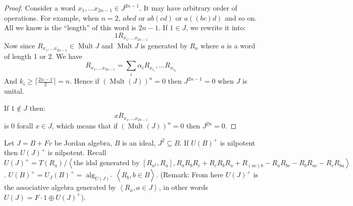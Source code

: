 \documentclass{article}
\def\<{\mathop{\langle}}
\def\>{\mathop{\rangle}}
\begin{document}
\begin{proof}
Consider a word $ x_1, \ldots x_{2n-1} \in J^{2n-1} $. It may have arbitrary order of operations. For example, when $ n=2 $, $ abcd $ or $ ab(cd) $ or $ a((bc)d) $ and so on. All we know is the ``length'' of this word is $ 2n-1 $. If $ 1 \in J $, we rewrite it into:
\[
1 R_{x_1, \ldots x_{2n-1}}
\]      
Now since $R_{x_1, \ldots x_{2n-1}} \in \operatorname{Mult}J  $ and $  \operatorname{Mult}J  $ is generated by $ R_a $ where $ a $ is a word of length 1 or 2. We have 
\[
R_{x_1, \ldots x_{2n-1}}=\sum_i \alpha_i R_{x_{i_1}}, \ldots R_{x_{i_{k_i}}}
\]    
And $ k_i \ge \lceil\frac{2n-1}{2}\rceil=n $. Hence if $ (\operatorname{Mult}(J))^{n}=0 $ then $ J^{2n-1}=0 $ when $ J $ is unital. 

If $ 1 \notin J $ then:
\[
xR_{x_1, \ldots x_{2n-1}}
\] 
is 0 forall $ x \in J $, which means that if $ (\operatorname{Mult}(J))^{n}=0 $ then $ J^{2n}=0 $. 
\end{proof}

\begin{lemma} 
Let $ J =B+Fv$ be Jordan algebra, $ B $ is an ideal, $ J^2 \subseteq B $. If $ U(B)^+ $ is nilpotent then $ U(J)^+ $ is nilpotent. Recall $ U(J)^+=T(R_a)/ \<\text{the idal generated by }[R_{a^2}, R_a], R_a R_b R_c +R_c R_b R_a +R_{(ac)b}-R_aR_{bc}-R_bR_{ac}-R_cR_{ba} \> $. $ U(B)^+=U_J(B)^+=\operatorname{alg}_{U(J)^+}\< R_b, b\in B \> $. (Remark: From here $ U(J)^+ $ is the associative algebra generated by $ \<R_a, a \in J \> $, in other words $ U(J)=F\cdot 1\oplus U(J)^+ $).      
\end{lemma}
\end{document}
